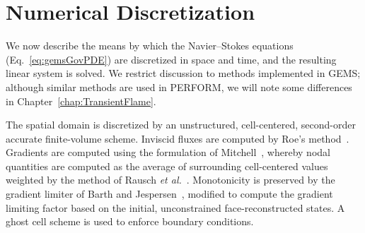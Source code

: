 \section{Numerical Discretization}\label{sec:numerics}

We now describe the means by which the Navier--Stokes equations (Eq.~\ref{eq:gemsGovPDE}) are discretized in space and time, and the resulting linear system is solved. We restrict discussion to methods implemented in GEMS; although similar methods are used in PERFORM, we will note some differences in Chapter~\ref{chap:TransientFlame}.

The spatial domain is discretized by an unstructured, cell-centered, second-order accurate finite-volume scheme. Inviscid fluxes are computed by Roe's method~\cite{Roe1981}. Gradients are computed using the formulation of Mitchell~\cite{Mitchell1994}, whereby nodal quantities are computed as the average of surrounding cell-centered values weighted by the method of Rausch \textit{et al.}~\cite{Rausch1991}. Monotonicity is preserved by the gradient limiter of Barth and Jespersen~\cite{Barth1989}, modified to compute the gradient limiting factor based on the initial, unconstrained face-reconstructed states. A ghost cell scheme is used to enforce boundary conditions.

